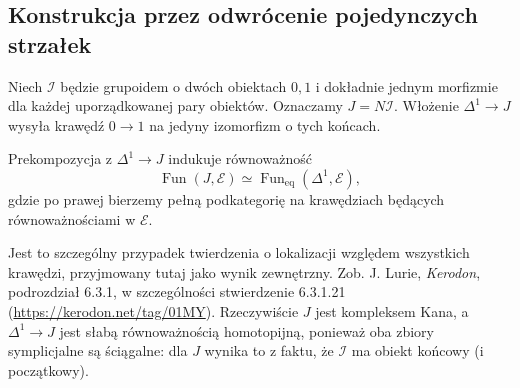 \subsection{Konstrukcja przez odwrócenie pojedynczych strzałek}

Niech $\mathcal I$ będzie grupoidem o dwóch obiektach $0,1$ i dokładnie jednym morfizmie dla każdej uporządkowanej pary obiektów. Oznaczamy $J=N\mathcal I$. Włożenie $\Delta^1\to J$ wysyła krawędź $0\to1$ na jedyny izomorfizm o tych końcach.

\begin{lemat}\label{cat:lem:infty-localization-walking-iso}
Prekompozycja z $\Delta^1\to J$ indukuje równoważność
\[
 \operatorname{Fun}(J,\mathcal E)\simeq
 \operatorname{Fun}_{\mathrm{eq}}(\Delta^1,\mathcal E),
\]
gdzie po prawej bierzemy pełną podkategorię na krawędziach będących równoważnościami w $\mathcal E$.
\end{lemat}

Jest to szczególny przypadek twierdzenia o lokalizacji względem wszystkich krawędzi, przyjmowany tutaj jako wynik zewnętrzny. Zob. J. Lurie, \emph{Kerodon}, podrozdział 6.3.1, w szczególności stwierdzenie 6.3.1.21 (\url{https://kerodon.net/tag/01MY}). Rzeczywiście $J$ jest kompleksem Kana, a $\Delta^1\to J$ jest słabą równoważnością homotopijną, ponieważ oba zbiory symplicjalne są ściągalne: dla $J$ wynika to z faktu, że $\mathcal I$ ma obiekt końcowy (i początkowy).

